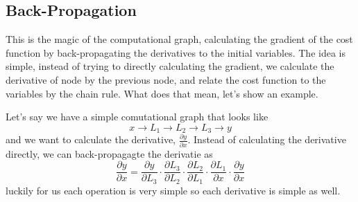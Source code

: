 \documentclass[english, a4paper, 12pt, twoside]{article}
\numberwithin{equation}{section} %
\begin{document}
\subsection{Back-Propagation}
This is the magic of the computational graph, calculating the gradient of the cost function by back-propagating the derivatives to the initial variables. The idea is simple, instead of trying to directly calculating the gradient, we calculate the derivative of node by the previous node, and relate the cost function to the variables by the chain rule. What does that mean, let's show an example.

Let's say we have a simple comutational graph that looks like
\[x \rightarrow L_1 \rightarrow L_2 \rightarrow L_3 \rightarrow y\] %
and we want to calculate the derivative, $\frac{\partial y}{\partial x}$. Instead of calculating the derivative directly, we can back-propagagte the derivatie as
\[\frac{\partial y}{\partial x} = \frac{\partial y}{\partial L_3} \cdot \frac{\partial L_3}{\partial L_2} \cdot \frac{\partial L_2}{\partial L_1} \cdot \frac{\partial L_1}{\partial x} \cdot \frac{\partial y}{\partial x}\]
luckily for us each operation is very simple so each derivative is simple as well.
\end{document}
